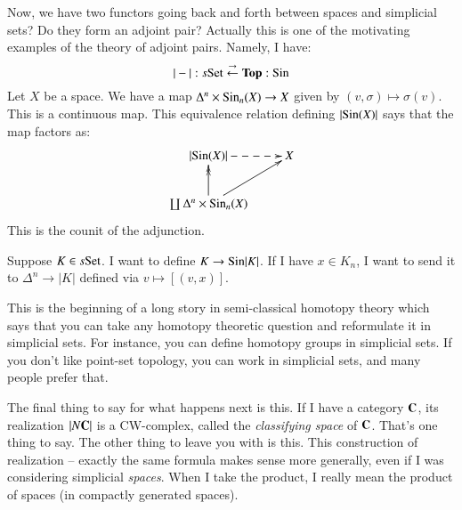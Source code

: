 Now, we have two functors going back and forth between spaces and simplicial sets?
Do they form an adjoint pair?
Actually this is one of the motivating examples of the theory of adjoint pairs. Namely, I have:
$$
|-|:s\mathrm{Set}\stackrel{\rightarrow}{\leftarrow} \mathbf{Top}:\mathrm{Sin}
$$
Let $X$ be a space.
We have a map $\Delta^n\times\mathrm{Sin}_n(X)\to X$ given by $(v,\sigma)\mapsto \sigma(v)$.
This is a continuous map.
This equivalence relation defining $|\mathrm{Sin}(X)|$ says that the map factors as:
\begin{equation*}
    \xymatrix{
	|\Sin(X)|\ar@{-->}[r] & X\\
	\coprod\Delta^n\times\Sin_n(X)\ar[ur]\ar@{->>}[u] &
    }
\end{equation*}
This is the counit of the adjunction.

Suppose $K\in s\mathrm{Set}$. I want to define $K\to\mathrm{Sin}|K|$.
If I have $x\in K_n$, I want to send it to $\Delta^n\to |K|$ defined via $v\mapsto [(v,x)]$.

This is the beginning of a long story in semi-classical homotopy theory which says that you can take any homotopy theoretic question and reformulate it in simplicial sets.
For instance, you can define homotopy groups in simplicial sets.
If you don't like point-set topology, you can work in simplicial sets, and many people prefer that.

The final thing to say for what happens next is this. If I have a category $\mathbf C$, its realization $|N\mathbf C|$ is a CW-complex, called the \emph{classifying space} of $\mathbf C$.
That's one thing to say.
The other thing to leave you with is this.
This construction of realization -- exactly the same formula makes sense more generally, even if I was considering simplicial \emph{spaces}.
When I take the product, I really mean the product of spaces (in compactly generated spaces).
